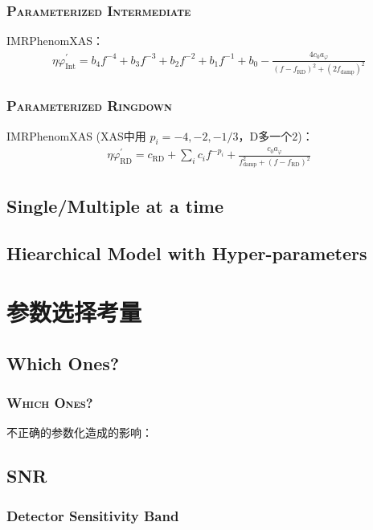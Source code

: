 \documentclass[CJK,aspectratio=169]{beamer}  %
\begin{document}
\begin{frame}[allowframebreaks]
	\frametitle{\textsc{Parameterized Intermediate}}
	IMRPhenomXAS：
	\begin{align}
		\eta \varphi_\text{Int}^\prime = b_4f^{-4} + b_3f^{-3} + b_2f^{-2} + b_1f^{-1} + b_0 - \frac{4 c_0 a_\varphi}{(f-f_\text{RD})^2 + (2f_\text{damp})^2}
	\end{align}
\end{frame}

\begin{frame}[allowframebreaks]
	\frametitle{\textsc{Parameterized Ringdown}}
	IMRPhenomXAS (XAS中用 $p_i = -4, -2, -1/3$，D多一个$2$)：
	\begin{align}
		\eta \varphi_\text{RD}^\prime = c_\text{RD} + \sum_i c_i f^{-p_i} + \frac{c_0 a_\varphi}{f_\text{damp}^2 + (f-f_\text{RD})^2}
	\end{align}
\end{frame}



\subsection{Single/Multiple at a time}


\subsection{Hiearchical Model with Hyper-parameters}


\section{参数选择考量}

\subsection{Which Ones?}
\begin{frame}
	\frametitle{\textsc{Which Ones?}}
	\par 不正确的参数化造成的影响：\cite{false_parametrization}
\end{frame}

\subsection{SNR}
\subsubsection{Detector Sensitivity Band}
\end{document}
